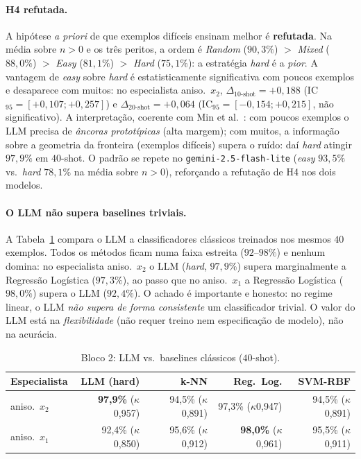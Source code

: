 \documentclass[12pt,a4paper]{article}
\begin{document}
\paragraph{H4 refutada.}
A hipótese \emph{a priori} de que exemplos difíceis ensinam melhor é \textbf{refutada}. Na
média sobre $n>0$ e os três peritos, a ordem é \emph{Random} ($90{,}3\%$) $>$ \emph{Mixed}
($88{,}0\%$) $>$ \emph{Easy} ($81{,}1\%$) $>$ \emph{Hard} ($75{,}1\%$): a estratégia
\emph{hard} é a \emph{pior}. A vantagem de \emph{easy} sobre \emph{hard} é estatisticamente
significativa com poucos exemplos e desaparece com muitos: no especialista aniso.\ $x_2$,
$\Delta_{10\text{-shot}} = +0{,}188$ (IC$_{95}=[+0{,}107;+0{,}257]$) e
$\Delta_{20\text{-shot}} = +0{,}064$ (IC$_{95}=[-0{,}154;+0{,}215]$, não significativo). A
interpretação, coerente com Min et al.~\cite{minRethinkingRole2022}: com poucos exemplos o
LLM precisa de \emph{âncoras prototípicas} (alta margem); com muitos, a informação sobre a
geometria da fronteira (exemplos difíceis) supera o ruído: daí \emph{hard} atingir $97{,}9\%$
em $40$-shot. O padrão se repete no \texttt{gemini-2.5-flash-lite} (\emph{easy} $93{,}5\%$
vs.\ \emph{hard} $78{,}1\%$ na média sobre $n>0$), reforçando a refutação de H4 nos dois
modelos.

\paragraph{O LLM não supera baselines triviais.}
A Tabela~\ref{tab:baselines} compara o LLM a classificadores clássicos treinados nos mesmos
$40$ exemplos. Todos os métodos ficam numa faixa estreita ($92$–$98\%$) e nenhum domina: no
especialista aniso.\ $x_2$ o LLM (\emph{hard}, $97{,}9\%$) supera marginalmente a Regressão
Logística ($97{,}3\%$), ao passo que no aniso.\ $x_1$ a Regressão Logística ($98{,}0\%$)
supera o LLM ($92{,}4\%$). O achado é importante e honesto: no regime linear, o LLM
\emph{não supera de forma consistente} um classificador trivial. O valor do LLM está na
\emph{flexibilidade} (não requer treino nem especificação de modelo), não na acurácia.

\begin{table}[ht]
\centering
\caption{Bloco 2: LLM vs.\ baselines clássicos ($40$-shot).}
\label{tab:baselines}
\begin{tabular}{lrrrr}
\toprule
\textbf{Especialista} & \textbf{LLM (hard)} & \textbf{k-NN} &
\textbf{Reg.\ Log.} & \textbf{SVM-RBF} \\
\midrule
aniso.\ $x_2$ & \textbf{97,9\%} ($\kappa$0,957) & 94,5\% ($\kappa$0,891) &
  97,3\% ($\kappa$0,947) & 94,5\% ($\kappa$0,891) \\
aniso.\ $x_1$ & 92,4\% ($\kappa$0,850)         & 95,6\% ($\kappa$0,912)    &
  \textbf{98,0\%} ($\kappa$0,961) & 95,5\% ($\kappa$0,911) \\
\bottomrule
\end{tabular}
\end{table}
\end{document}
